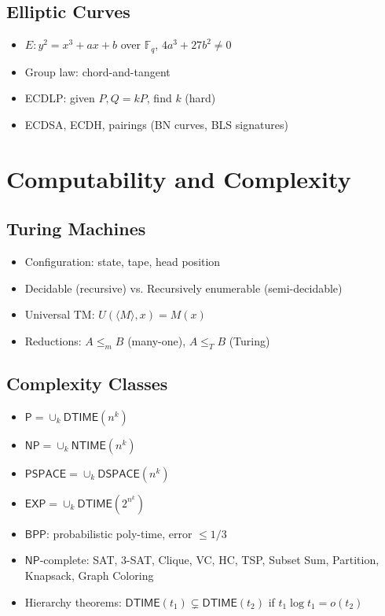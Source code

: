 \subsection{Elliptic Curves}
\begin{itemize}
\item $E: y^2 = x^3 + ax + b$ over $\mathbb{F}_q$, $4a^3+27b^2 \ne 0$
\item Group law: chord-and-tangent
\item ECDLP: given $P, Q=kP$, find $k$ (hard)
\item ECDSA, ECDH, pairings (BN curves, BLS signatures)
\end{itemize}

\section{Computability and Complexity}

\subsection{Turing Machines}
\begin{itemize}
\item Configuration: state, tape, head position
\item Decidable (recursive) vs. Recursively enumerable (semi-decidable)
\item Universal TM: $U(\langle M \rangle, x) = M(x)$
\item Reductions: $A \le_m B$ (many-one), $A \le_T B$ (Turing)
\end{itemize}

\subsection{Complexity Classes}
\begin{itemize}
\item $\mathsf{P} = \cup_k \mathsf{DTIME}(n^k)$
\item $\mathsf{NP} = \cup_k \mathsf{NTIME}(n^k)$
\item $\mathsf{PSPACE} = \cup_k \mathsf{DSPACE}(n^k)$
\item $\mathsf{EXP} = \cup_k \mathsf{DTIME}(2^{n^k})$
\item $\mathsf{BPP}$: probabilistic poly-time, error $\le 1/3$
\item $\mathsf{NP}$-complete: SAT, 3-SAT, Clique, VC, HC, TSP, Subset Sum, Partition, Knapsack, Graph Coloring
\item Hierarchy theorems: $\mathsf{DTIME}(t_1) \subsetneq \mathsf{DTIME}(t_2)$ if $t_1 \log t_1 = o(t_2)$
\end{itemize}

